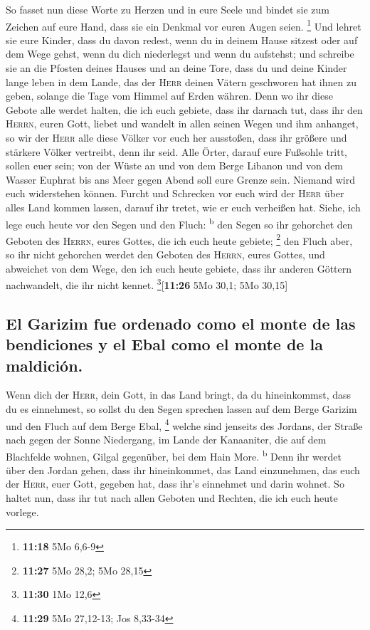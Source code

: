  So fasset nun diese Worte zu Herzen und in eure Seele
und bindet sie zum Zeichen auf eure Hand, dass sie ein Denkmal vor euren
Augen seien. \footnote{\textbf{11:18} 5Mo 6,6-9}  Und
lehret sie eure Kinder, dass du davon redest, wenn du in deinem Hause
sitzest oder auf dem Wege gehst, wenn du dich niederlegst und wenn du
aufstehst;  und schreibe sie an die Pfosten deines Hauses
und an deine Tore,  dass du und deine Kinder lange leben
in dem Lande, das der \textsc{Herr} deinen Vätern geschworen hat ihnen
zu geben, solange die Tage vom Himmel auf Erden währen. 
Denn wo ihr diese Gebote alle werdet halten, die ich euch gebiete, dass
ihr darnach tut, dass ihr den \textsc{Herrn}, euren Gott, liebet und
wandelt in allen seinen Wegen und ihm anhanget,  so wir
der \textsc{Herr} alle diese Völker vor euch her ausstoßen, dass ihr
größere und stärkere Völker vertreibt, denn ihr seid. 
Alle Örter, darauf eure Fußsohle tritt, sollen euer sein; von der Wüste
an und von dem Berge Libanon und von dem Wasser Euphrat bis ans Meer
gegen Abend soll eure Grenze sein.  Niemand wird euch
widerstehen können. Furcht und Schrecken vor euch wird der \textsc{Herr}
über alles Land kommen lassen, darauf ihr tretet, wie er euch verheißen
hat.  Siehe, ich lege euch heute vor den Segen und den
Fluch: \textsuperscript{b}  den Segen so ihr gehorchet
den Geboten des \textsc{Herrn}, eures Gottes, die ich euch heute
gebiete; \footnote{\textbf{11:27} 5Mo 28,2; 5Mo 28,15} 
den Fluch aber, so ihr nicht gehorchen werdet den Geboten des
\textsc{Herrn}, eures Gottes, und abweichet von dem Wege, den ich euch
heute gebiete, dass ihr anderen Göttern nachwandelt, die ihr nicht
kennet. \footnote{\textbf{11:30} 1Mo 12,6}{[}\textbf{11:26} 5Mo 30,1;
5Mo 30,15{]}

\hypertarget{el-garizim-fue-ordenado-como-el-monte-de-las-bendiciones-y-el-ebal-como-el-monte-de-la-maldiciuxf3n.}{%
\subsection{El Garizim fue ordenado como el monte de las bendiciones y
el Ebal como el monte de la
maldición.}\label{el-garizim-fue-ordenado-como-el-monte-de-las-bendiciones-y-el-ebal-como-el-monte-de-la-maldiciuxf3n.}}

 Wenn dich der \textsc{Herr}, dein Gott, in das Land
bringt, da du hineinkommst, dass du es einnehmest, so sollst du den
Segen sprechen lassen auf dem Berge Garizim und den Fluch auf dem Berge
Ebal, \footnote{\textbf{11:29} 5Mo 27,12-13; Jos 8,33-34}
 welche sind jenseits des Jordans, der Straße nach gegen
der Sonne Niedergang, im Lande der Kanaaniter, die auf dem Blachfelde
wohnen, Gilgal gegenüber, bei dem Hain More. \textsuperscript{b}
 Denn ihr werdet über den Jordan gehen, dass ihr
hineinkommet, das Land einzunehmen, das euch der \textsc{Herr}, euer
Gott, gegeben hat, dass ihr's einnehmet und darin wohnet.
 So haltet nun, dass ihr tut nach allen Geboten und
Rechten, die ich euch heute vorlege.

